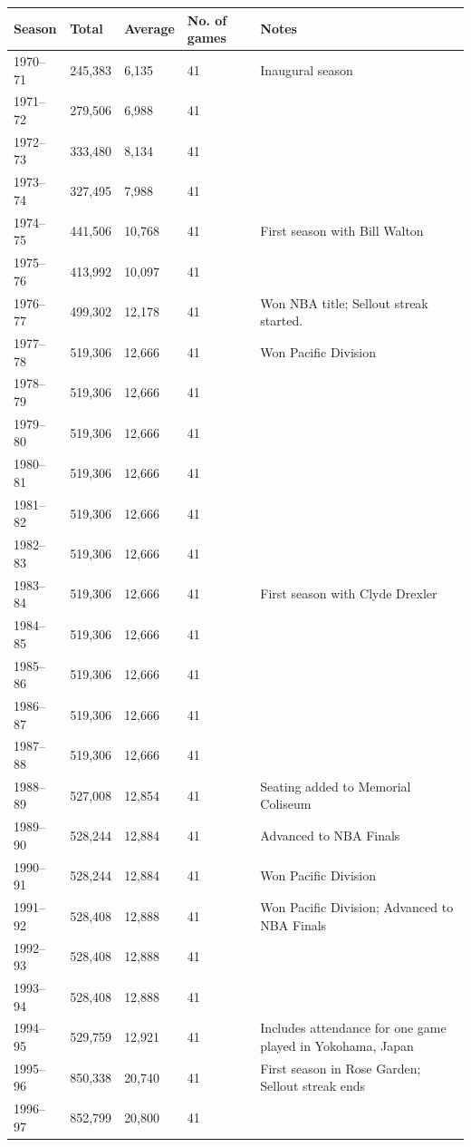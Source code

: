\documentclass{article}
\begin{document}
\begin{tabular}{lllll}
\toprule
Season & Total & Average & No. of games & Notes \\
\midrule
1970–71 & 245,383 & 6,135 & 41 & Inaugural season \\
1971–72 & 279,506 & 6,988 & 41 &  \\
1972–73 & 333,480 & 8,134 & 41 &  \\
1973–74 & 327,495 & 7,988 & 41 &  \\
1974–75 & 441,506 & 10,768 & 41 & First season with Bill Walton \\
1975–76 & 413,992 & 10,097 & 41 &  \\
1976–77 & 499,302 & 12,178 & 41 & Won NBA title; Sellout streak started. \\
1977–78 & 519,306 & 12,666 & 41 & Won Pacific Division \\
1978–79 & 519,306 & 12,666 & 41 &  \\
1979–80 & 519,306 & 12,666 & 41 &  \\
1980–81 & 519,306 & 12,666 & 41 &  \\
1981–82 & 519,306 & 12,666 & 41 &  \\
1982–83 & 519,306 & 12,666 & 41 &  \\
1983–84 & 519,306 & 12,666 & 41 & First season with Clyde Drexler \\
1984–85 & 519,306 & 12,666 & 41 &  \\
1985–86 & 519,306 & 12,666 & 41 &  \\
1986–87 & 519,306 & 12,666 & 41 &  \\
1987–88 & 519,306 & 12,666 & 41 &  \\
1988–89 & 527,008 & 12,854 & 41 & Seating added to Memorial Coliseum \\
1989–90 & 528,244 & 12,884 & 41 & Advanced to NBA Finals \\
1990–91 & 528,244 & 12,884 & 41 & Won Pacific Division \\
1991–92 & 528,408 & 12,888 & 41 & Won Pacific Division; Advanced to NBA Finals \\
1992–93 & 528,408 & 12,888 & 41 &  \\
1993–94 & 528,408 & 12,888 & 41 &  \\
1994–95 & 529,759 & 12,921 & 41 & Includes attendance for one game played in Yokohama, Japan \\
1995–96 & 850,338 & 20,740 & 41 & First season in Rose Garden; Sellout streak ends \\
1996–97 & 852,799 & 20,800 & 41 &  \\

\end{tabular}
\end{document}
